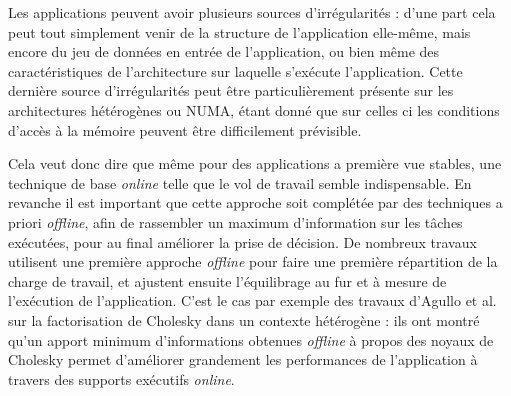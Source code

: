Les applications peuvent avoir plusieurs sources d'irrégularités : d'une part cela peut tout simplement venir de la structure de l'application elle-même, mais encore du jeu de données en entrée de l'application, ou bien même des caractéristiques de l'architecture sur laquelle s'exécute l'application.
Cette dernière source d'irrégularités peut être particulièrement présente sur les architectures hétérogènes ou NUMA, étant donné que sur celles ci les conditions d'accès à la mémoire peuvent être difficilement prévisible.

Cela veut donc dire que même pour des applications a première vue stables, une technique de base \emph{online} telle que le vol de travail semble indispensable.
En revanche il est important que cette approche soit complétée par des techniques a priori \emph{offline}, afin de rassembler un maximum d'information sur les tâches exécutées, pour au final améliorer la prise de décision.
De nombreux travaux utilisent une première approche \emph{offline} pour faire une première répartition de la charge de travail, et ajustent ensuite l'équilibrage au fur et à mesure de l'exécution de l'application.
C'est le cas par exemple des travaux d'Agullo et al.~\cite{Agullo2016} sur la factorisation de Cholesky dans un contexte hétérogène : ils ont montré qu'un apport minimum d'informations obtenues \emph{offline} à propos des noyaux de Cholesky permet d'améliorer grandement les performances de l'application à travers des supports exécutifs \emph{online}.



